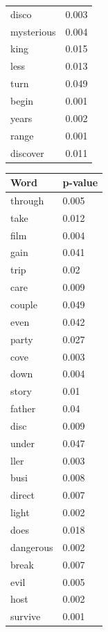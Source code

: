 \documentclass[12pt, oneside]{article}   	%
\begin{document}
\begin{table}[H]
\begin{tabular}[t]{l|l}
disco       & 0.003    \\
mysterious  & 0.004    \\
king        & 0.015    \\
less        & 0.013    \\
turn        & 0.049    \\
begin       & 0.001    \\
years       & 0.002    \\
range       & 0.001    \\
discover    & 0.011    \\
\end{tabular}
\begin{tabular}[t]{l|l}
\textbf{Word}        & \textbf{p-value} \\ \hline
through     & 0.005    \\
take        & 0.012    \\
film        & 0.004    \\
gain        & 0.041    \\
trip        & 0.02     \\
care        & 0.009    \\
couple      & 0.049    \\
even        & 0.042    \\
party       & 0.027    \\
cove        & 0.003    \\
down        & 0.004    \\
story       & 0.01     \\
father      & 0.04     \\
disc        & 0.009    \\
under       & 0.047    \\
ller        & 0.003    \\
busi        & 0.008    \\
direct      & 0.007    \\
light       & 0.002    \\
does        & 0.018    \\
dangerous   & 0.002    \\
break       & 0.007    \\
evil        & 0.005    \\
host        & 0.002    \\
survive     & 0.001    \\

\end{tabular}
\end{table}
\end{document}
